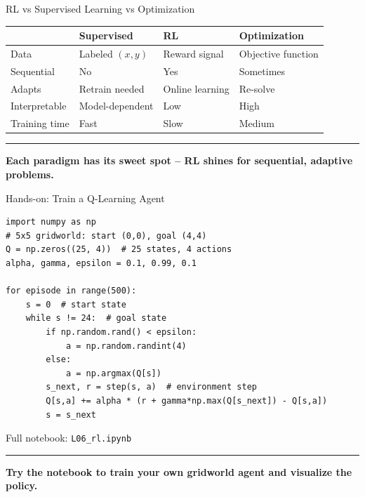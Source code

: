 \documentclass[8pt,aspectratio=169]{beamer}
\newcommand{\bottomnote}[1]{%
\vfill
\vspace{-2mm}
\textcolor{mllavender2}{\rule{\textwidth}{0.4pt}}
\vspace{1mm}
\footnotesize
\textbf{#1}
}
\begin{document}
\begin{frame}{RL vs Supervised Learning vs Optimization}
\small
\begin{tabular}{p{2.5cm}p{3cm}p{3cm}p{3cm}}
\toprule
& \textbf{Supervised} & \textbf{RL} & \textbf{Optimization} \\
\midrule
Data & Labeled $(x,y)$ & Reward signal & Objective function \\
Sequential & No & Yes & Sometimes \\
Adapts & Retrain needed & Online learning & Re-solve \\
Interpretable & Model-dependent & Low & High \\
Training time & Fast & Slow & Medium \\
\bottomrule
\end{tabular}

\bottomnote{Each paradigm has its sweet spot -- RL shines for sequential, adaptive problems.}
\end{frame}

\begin{frame}[fragile]{Hands-on: Train a Q-Learning Agent}
\small
\begin{verbatim}
import numpy as np
# 5x5 gridworld: start (0,0), goal (4,4)
Q = np.zeros((25, 4))  # 25 states, 4 actions
alpha, gamma, epsilon = 0.1, 0.99, 0.1

for episode in range(500):
    s = 0  # start state
    while s != 24:  # goal state
        if np.random.rand() < epsilon:
            a = np.random.randint(4)
        else:
            a = np.argmax(Q[s])
        s_next, r = step(s, a)  # environment step
        Q[s,a] += alpha * (r + gamma*np.max(Q[s_next]) - Q[s,a])
        s = s_next
\end{verbatim}
\vspace{2pt}
\small Full notebook: \texttt{L06\_rl.ipynb}

\bottomnote{Try the notebook to train your own gridworld agent and visualize the policy.}
\end{frame}
\end{document}

